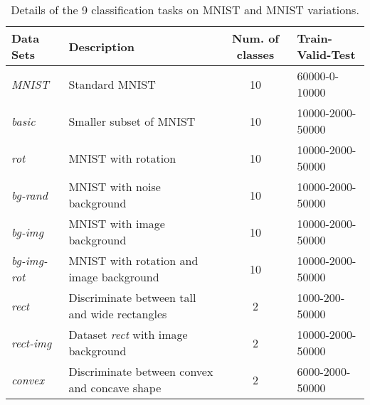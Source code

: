 \documentclass[10pt,journal,compsoc]{IEEEtran}
\begin{document}
\begin{table*}[htbp]\caption{Details of the 9 classification tasks on MNIST and MNIST variations.}\label{table: mnist_details}
\centering
\begin{tabular}{l|l|c|l}
   \hline
{Data Sets}   & { Description} & { Num. of classes} & { Train-Valid-Test} \\ \hline \hline
   {\it MNIST}       & {\rm Standard MNIST} & 10 & 60000-0-10000 \\
   {\it basic}       & {\rm Smaller subset of MNIST} & 10 & 10000-2000-50000 \\
   {\it rot}         & {\rm MNIST with rotation} & 10 & 10000-2000-50000 \\
   {\it bg-rand}     & {\rm MNIST with noise background} & 10 & 10000-2000-50000 \\
   {\it bg-img}      & {\rm MNIST with image background} & 10 & 10000-2000-50000 \\
   {\it bg-img-rot}  & {\rm MNIST with rotation and image background} & 10 & 10000-2000-50000 \\
   {\it rect}        & {\rm Discriminate between tall and wide rectangles} & 2 & 1000-200-50000 \\
   {\it rect-img}    & {\rm Dataset {\it rect} with image background} & 2 & 10000-2000-50000 \\
   {\it convex}      & {\rm Discriminate between convex and concave shape} & 2 & 6000-2000-50000 \\
   \hline
\end{tabular}\end{table*}
\end{document}
